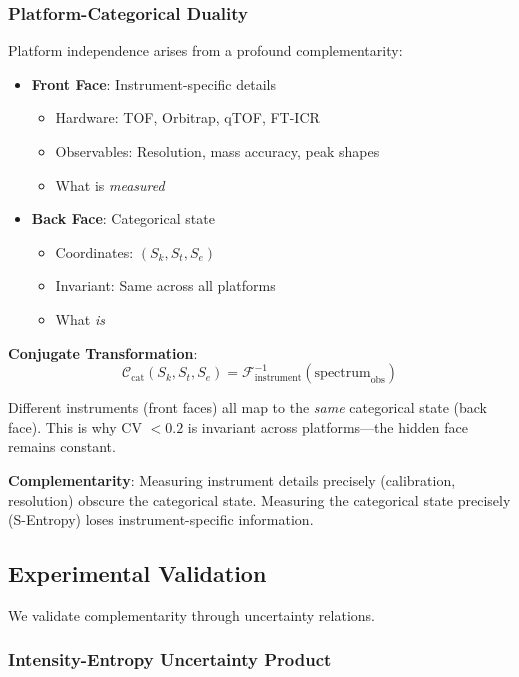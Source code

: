 \documentclass[twocolumn,10pt,a4paper]{article}
\theoremstyle{definition}
\theoremstyle{remark}
\begin{document}
\subsubsection{Platform-Categorical Duality}

Platform independence arises from a profound complementarity:

\begin{itemize}
\item \textbf{Front Face}: Instrument-specific details
  \begin{itemize}
  \item Hardware: TOF, Orbitrap, qTOF, FT-ICR
  \item Observables: Resolution, mass accuracy, peak shapes
  \item What is \emph{measured}
  \end{itemize}

\item \textbf{Back Face}: Categorical state
  \begin{itemize}
  \item Coordinates: $(S_k, S_t, S_e)$
  \item Invariant: Same across all platforms
  \item What \emph{is}
  \end{itemize}
\end{itemize}

\textbf{Conjugate Transformation}:
\begin{equation}
\mathcal{C}_{\text{cat}}(S_k, S_t, S_e) = \mathcal{F}_{\text{instrument}}^{-1}(\text{spectrum}_{\text{obs}})
\end{equation}

Different instruments (front faces) all map to the \emph{same} categorical state (back face). This is why CV $< 0.2$ is invariant across platforms—the hidden face remains constant.

\textbf{Complementarity}: Measuring instrument details precisely (calibration, resolution) obscure the categorical state. Measuring the categorical state precisely (S-Entropy) loses instrument-specific information.

\subsection{Experimental Validation}

We validate complementarity through uncertainty relations.

\subsubsection{Intensity-Entropy Uncertainty Product}
\end{document}

